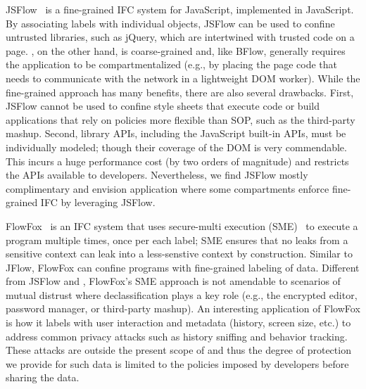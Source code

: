 JSFlow~\cite{JSFlow} is a fine-grained IFC system for JavaScript,
implemented in JavaScript.
%
By associating labels with individual objects, JSFlow can be used to
confine untrusted libraries, such as jQuery, which are intertwined with
trusted code on a page.
%
\sys{}, on the other hand, is coarse-grained and, like BFlow, generally
requires the application to be compartmentalized (e.g., by placing the
page code that needs to communicate with the network in a lightweight
DOM worker).
%
While the fine-grained approach has many benefits, there
are also several drawbacks.
%
First, JSFlow cannot be used to confine style sheets that execute code
or build applications that rely on policies more flexible than SOP,
such as the third-party mashup.
%
%
Second, library APIs, including the JavaScript built-in APIs, must be
individually modeled; though their coverage of the DOM is very commendable.
%
This incurs a huge performance cost (by two orders of magnitude)
and restricts the APIs available to developers.
%
Nevertheless, we find JSFlow mostly complimentary and envision
application where some \sys{} compartments enforce fine-grained IFC by
leveraging JSFlow.




FlowFox~\cite{DeGroef:2012} is an IFC system that uses secure-multi
execution (SME)~\cite{Devriese:2010} to execute a program multiple
times, once per each label; SME ensures that no leaks from a sensitive
context can leak into a less-senstive context by construction.
%
Similar to JFlow, FlowFox can confine programs
with fine-grained labeling of data.
%
Different from JSFlow and \sys{}, FlowFox's SME approach is not
amendable to scenarios of mutual distrust where declassification plays
a key role (e.g., the encrypted editor, password manager, or
third-party mashup).
%
An interesting application of FlowFox is how it labels with user interaction and metadata
(history, screen size, etc.) to address common privacy attacks such as
history sniffing and behavior tracking.
%
These attacks are outside the present scope of \sys{} and thus the
degree of protection we provide for such data is limited to the
policies imposed by developers before sharing the data.

